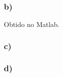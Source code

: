 \documentclass[11pt, a4paper, titlepage, portuguese]{article}
\begin{document}
	\subsubsection{b)}
		\par
		Obtido no Matlab.

	\subsubsection{c)}

	\subsubsection{d)}



\end{document}
